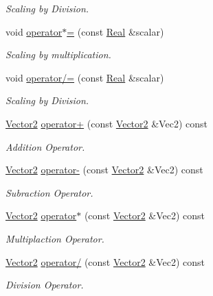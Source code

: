 \begin{DoxyCompactItemize}
\begin{DoxyCompactList}\small\item\em Scaling by Division. \item\end{DoxyCompactList}\item 
void \hyperlink{classphys_1_1Vector2_a0b1555274551eb9bdea20d762c446e99}{operator$\ast$=} (const \hyperlink{namespacephys_af7eb897198d265b8e868f45240230d5f}{Real} \&scalar)
\begin{DoxyCompactList}\small\item\em Scaling by multiplication. \item\end{DoxyCompactList}\item 
void \hyperlink{classphys_1_1Vector2_a27a0da5b4cfa49ea92dd16107692775b}{operator/=} (const \hyperlink{namespacephys_af7eb897198d265b8e868f45240230d5f}{Real} \&scalar)
\begin{DoxyCompactList}\small\item\em Scaling by Division. \item\end{DoxyCompactList}\item 
\hyperlink{classphys_1_1Vector2}{Vector2} \hyperlink{classphys_1_1Vector2_a62102e9d75364c6be43723867cec3df8}{operator+} (const \hyperlink{classphys_1_1Vector2}{Vector2} \&Vec2) const 
\begin{DoxyCompactList}\small\item\em Addition Operator. \item\end{DoxyCompactList}\item 
\hyperlink{classphys_1_1Vector2}{Vector2} \hyperlink{classphys_1_1Vector2_a0aef47f873ef5a78707dd850d7d59504}{operator-\/} (const \hyperlink{classphys_1_1Vector2}{Vector2} \&Vec2) const 
\begin{DoxyCompactList}\small\item\em Subraction Operator. \item\end{DoxyCompactList}\item 
\hyperlink{classphys_1_1Vector2}{Vector2} \hyperlink{classphys_1_1Vector2_a6a253bb2507b9254a102c0793bf0f215}{operator$\ast$} (const \hyperlink{classphys_1_1Vector2}{Vector2} \&Vec2) const 
\begin{DoxyCompactList}\small\item\em Multiplaction Operator. \item\end{DoxyCompactList}\item 
\hyperlink{classphys_1_1Vector2}{Vector2} \hyperlink{classphys_1_1Vector2_a3e4afe212ce1c739942aa8385c8f71e9}{operator/} (const \hyperlink{classphys_1_1Vector2}{Vector2} \&Vec2) const 
\begin{DoxyCompactList}\small\item\em Division Operator. \item\end{DoxyCompactList}\end{DoxyCompactItemize}
